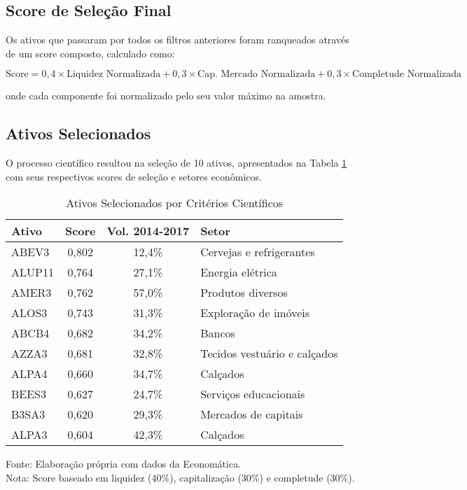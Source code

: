 \subsection{Score de Seleção Final}

Os ativos que passaram por todos os filtros anteriores foram ranqueados através de um score composto, calculado como:

$$\text{Score} = 0,4 \times \text{Liquidez Normalizada} + 0,3 \times \text{Cap. Mercado Normalizada} + 0,3 \times \text{Completude Normalizada}$$

onde cada componente foi normalizado pelo seu valor máximo na amostra.

\subsection{Ativos Selecionados}

O processo científico resultou na seleção de 10 ativos, apresentados na Tabela \ref{tab:ativos_selecionados} com seus respectivos scores de seleção e setores econômicos.

\begin{table}[htbp]
\centering
\caption{Ativos Selecionados por Critérios Científicos}
\label{tab:ativos_selecionados}
\begin{tabular}{|l|c|c|l|}
\hline
\textbf{Ativo} & \textbf{Score} & \textbf{Vol. 2014-2017} & \textbf{Setor} \\
\hline
ABEV3 & 0,802 & 12,4\% & Cervejas e refrigerantes \\
ALUP11 & 0,764 & 27,1\% & Energia elétrica \\
AMER3 & 0,762 & 57,0\% & Produtos diversos \\
ALOS3 & 0,743 & 31,3\% & Exploração de imóveis \\
ABCB4 & 0,682 & 34,2\% & Bancos \\
AZZA3 & 0,681 & 32,8\% & Tecidos vestuário e calçados \\
ALPA4 & 0,660 & 34,7\% & Calçados \\
BEES3 & 0,627 & 24,7\% & Serviços educacionais \\
B3SA3 & 0,620 & 29,3\% & Mercados de capitais \\
ALPA3 & 0,604 & 42,3\% & Calçados \\
\hline
\end{tabular}
\footnotesize
Fonte: Elaboração própria com dados da Economática.\\
Nota: Score baseado em liquidez (40\%), capitalização (30\%) e completude (30\%).
\end{table}

